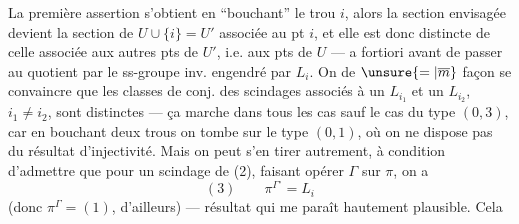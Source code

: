 La première assertion s'obtient en ``bouchant'' le trou $i$, alors la section envisagée devient la section de $U\cup\{i\}=U'$ associée au pt $i$, et elle est donc distincte de celle associée aux  autres pts de $U'$, i.e. aux pts de $U$ --- a fortiori avant de passer au quotient par le ss-groupe inv. engendré par $L_i$. On  de $\unsure{=|\overline m}$ façon se convaincre que les classes de conj. des scindages associés à un $L_{i_1}$ et un $L_{i_2}$, $i_1\ne i_2$, sont distinctes --- ça marche dans tous les cas sauf le cas du type $(0,3)$,  car en bouchant deux trous on tombe sur le type $(0,1)$, où on ne dispose pas du résultat d'injectivité. Mais on peut s'en tirer autrement, à condition d'admettre que pour un scindage de (2), faisant opérer $\Gamma$ sur $\pi$, on a
\[
(3)\qquad\pi^{\Gamma^\circ}=L_i
\]
(donc $\pi^\Gamma=(1)$, d'ailleurs) --- résultat qui me paraît hautement plausible. Cela

